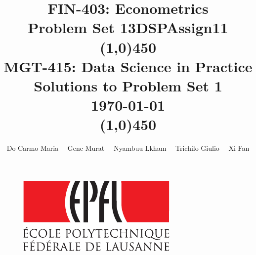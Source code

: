 \documentclass[8pt,onecolumn,aps,pra]{revtex4-1}
\title{
    \Huge \textbf{FIN-403: Econometrics} \\ 
    \huge Problem Set 13}
\date{}
\makeatletter
\def\maxwidth{\ifdim\Gin@nat@width>\linewidth\linewidth
\else\Gin@nat@width\fi}
\let\Oldincludegraphics\includegraphics
\renewcommand{\includegraphics}[1]{\Oldincludegraphics[width=.8\maxwidth]{#1}}
\makeatother
\begin{document}
    
    
    \title{DSPAssign11}\begin{titlepage} %
%
%
%
\title{
\line(1,0){450} 
\\ 
\Huge \textbf{MGT-415: Data Science in Practice} 
\bigskip
\\ 
\normalsize \textrm{Solutions to Problem Set 1}
\\ 
\normalsize \today
\\
\line(1,0){450}}
%

\Large \centering \author{Do Carmo Maria \ \  Genc Murat \ \  Nyambuu Lkham \ \ Trichilo Giulio \ \ Xi Fan}
\vskip 1in


\begin{figure}[b]
    \centering
    \includegraphics{EPFL-Logo.pdf}
\end{figure}

\maketitle
%
\end{titlepage} %





    
    

    
\end{document}

